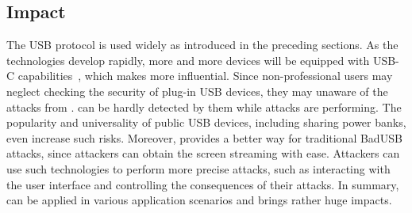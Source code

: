 \subsection{Impact}

The \ac{USB} protocol is used widely as introduced in the preceding sections.  As the
technologies develop rapidly, more and more devices will be equipped with USB-C
capabilities~\cite{li2018usb}, which makes \tool more influential.
Since non-professional users may neglect checking the security of plug-in \ac{USB} devices,
they may unaware of the attacks from \tool.
can be hardly detected by them while attacks are performing.
The popularity and universality of public \ac{USB} devices, including sharing power banks, even
increase such risks.  Moreover, \tool provides a better way for traditional
BadUSB attacks, since attackers can obtain the screen streaming with ease.
Attackers can use such technologies to perform more precise attacks, such as
interacting with the user interface and controlling the consequences of their
attacks.  In summary, \tool can be applied in various application scenarios and
brings rather huge impacts.
